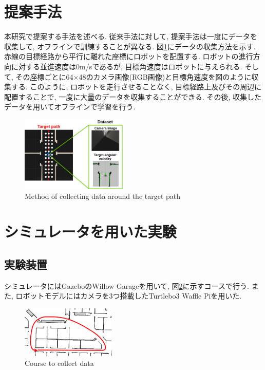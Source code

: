 \documentclass{ujarticle}
\begin{document}
\newpage
\section{提案手法}%
本研究で提案する手法を述べる. 従来手法に対して, 提案手法は一度にデータを収集して, オフラインで訓練することが異なる. 図\ref{Fig:collect}にデータの収集方法を示す. 赤線の目標経路から平行に離れた座標にロボットを配置する. ロボットの進行方向に対する並進速度は0m/sであるが, 目標角速度はロボットに与えられる. そして, その座標ごとに64×48のカメラ画像(RGB画像)と目標角速度を図のように収集する. このように, ロボットを走行させることなく, 目標経路上及びその周辺に配置することで, 一度に大量のデータを収集することができる. その後, 収集したデータを用いてオフラインで学習を行う.

\begin{figure}[h]
		\centering
		\includegraphics[width=0.45\textwidth]{img/proposed.png}
		\caption{Method of collecting data around the target path}
		\label{Fig:collect}
\end{figure}

\section{シミュレータを用いた実験}%
\subsection{実験装置}シミュレータにはGazebo\cite{gazebo}のWillow Garage\cite{willow}を用いて, 図\ref{Fig:willow}に示すコースで行う. また, ロボットモデルにはカメラを3つ搭載したTurtlebo3 Waffle Pi\cite{turtlebot3}を用いた. 

\begin{figure}[h]
		\centering
		\includegraphics[width=0.4\textwidth]{img/willow-path.png}
		\caption{Course to collect data}
		\label{Fig:willow}
\end{figure}
\end{document}
